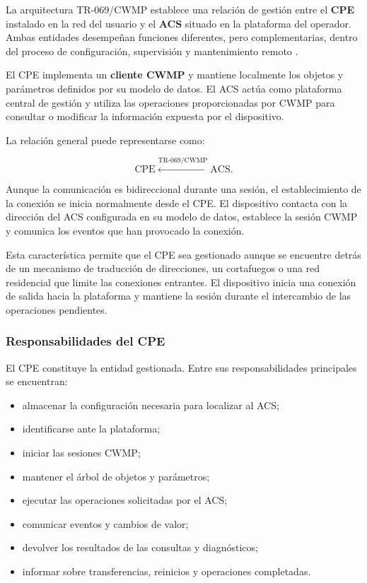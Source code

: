 La arquitectura TR-069/CWMP establece una relación de gestión entre el
\textbf{CPE} instalado en la red del usuario y el
\textbf{ACS} situado en la plataforma del operador. Ambas entidades
desempeñan funciones diferentes, pero complementarias, dentro del proceso
de configuración, supervisión y mantenimiento remoto
\cite{bbf_tr069}.

El CPE implementa un \textbf{cliente CWMP} y mantiene localmente los
objetos y parámetros definidos por su modelo de datos. El ACS actúa como
plataforma central de gestión y utiliza las operaciones proporcionadas por
CWMP para consultar o modificar la información expuesta por el
dispositivo.

La relación general puede representarse como:

\[
    \text{CPE}
    \overset{\text{TR-069/CWMP}}{\longleftrightarrow}
    \text{ACS}.
\]

Aunque la comunicación es bidireccional durante una sesión, el
establecimiento de la conexión se inicia normalmente desde el CPE. El
dispositivo contacta con la dirección del ACS configurada en su modelo de
datos, establece la sesión CWMP y comunica los eventos que han provocado
la conexión.

Esta característica permite que el CPE sea gestionado aunque se
encuentre detrás de un mecanismo de traducción de direcciones, un
cortafuegos o una red residencial que limite las conexiones entrantes.
El dispositivo inicia una conexión de salida hacia la plataforma y
mantiene la sesión durante el intercambio de las operaciones pendientes.


\subsubsection*{Responsabilidades del CPE}

El CPE constituye la entidad gestionada. Entre sus responsabilidades
principales se encuentran:

\begin{itemize}
    \item almacenar la configuración necesaria para localizar al ACS;
    \item identificarse ante la plataforma;
    \item iniciar las sesiones CWMP;
    \item mantener el árbol de objetos y parámetros;
    \item ejecutar las operaciones solicitadas por el ACS;
    \item comunicar eventos y cambios de valor;
    \item devolver los resultados de las consultas y diagnósticos;
    \item informar sobre transferencias, reinicios y operaciones
    completadas.
\end{itemize}

